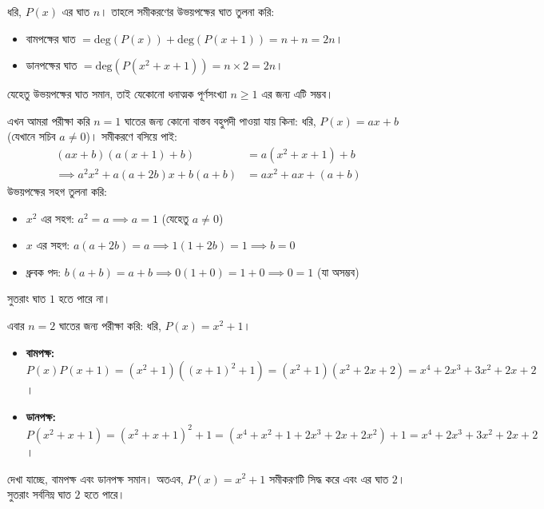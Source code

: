 \documentclass[12pt, a4paper]{article}
\begin{document}
\begin{tcolorbox}[solutionbox={সমাধান (Solution)}]
    \noindent
    ধরি, $P(x)$ এর ঘাত $n$। তাহলে সমীকরণের উভয়পক্ষের ঘাত তুলনা করি:
    \begin{itemize}
        \item বামপক্ষের ঘাত $= \text{deg}(P(x)) + \text{deg}(P(x+1)) = n + n = 2n$।
        \item ডানপক্ষের ঘাত $= \text{deg}(P(x^2+x+1)) = n \times 2 = 2n$।
    \end{itemize}
    যেহেতু উভয়পক্ষের ঘাত সমান, তাই যেকোনো ধনাত্মক পূর্ণসংখ্যা $n \ge 1$ এর জন্য এটি সম্ভব।
    
    এখন আমরা পরীক্ষা করি $n=1$ ঘাতের জন্য কোনো বাস্তব বহুপদী পাওয়া যায় কিনা: ধরি, $P(x) = ax+b$ (যেখানে সচিব $a \ne 0$)। সমীকরণে বসিয়ে পাই:
    \begin{align*}
        (ax+b)(a(x+1)+b) &= a(x^2+x+1)+b \\
        \implies a^2x^2 + a(a+2b)x + b(a+b) &= ax^2 + ax + (a+b)
    \end{align*}
    উভয়পক্ষের সহগ তুলনা করি:
    \begin{itemize}
        \item $x^2$ এর সহগ: $a^2 = a \implies a = 1$ (যেহেতু $a \ne 0$)
        \item $x$ এর সহগ: $a(a+2b) = a \implies 1(1+2b) = 1 \implies b = 0$
        \item ধ্রুবক পদ: $b(a+b) = a+b \implies 0(1+0) = 1+0 \implies 0 = 1$ (যা অসম্ভব)
    \end{itemize}
    সুতরাং ঘাত $1$ হতে পারে না।
    
    এবার $n=2$ ঘাতের জন্য পরীক্ষা করি: ধরি, $P(x) = x^2+1$।
    \begin{itemize}
        \item \textbf{বামপক্ষ:} $P(x)P(x+1) = (x^2+1)((x+1)^2+1) = (x^2+1)(x^2+2x+2) = x^4 + 2x^3 + 3x^2 + 2x + 2$।
        \item \textbf{ডানপক্ষ:} $P(x^2+x+1) = (x^2+x+1)^2 + 1 = (x^4 + x^2 + 1 + 2x^3 + 2x + 2x^2) + 1 = x^4 + 2x^3 + 3x^2 + 2x + 2$।
    \end{itemize}
    দেখা যাচ্ছে, বামপক্ষ এবং ডানপক্ষ সমান। অতএব, $P(x) = x^2+1$ সমীকরণটি সিদ্ধ করে এবং এর ঘাত $2$। সুতরাং সর্বনিম্ন ঘাত $2$ হতে পারে।
\end{tcolorbox}
\end{document}
